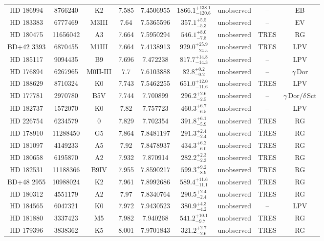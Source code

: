 \begin{table*}
\begin{tabular}{ccccccccc}
HD 186994 & 8766240 & K2 & 7.585 & 7.4506955 & $1866.1^{+138.1}_{-120.6}$ & unobserved & -- & EB \\
HD 183383 & 6777469 & M3III & 7.64 & 7.5365596 & $357.1^{+5.5}_{-5.3}$ & unobserved & -- & EV \\
HD 180475 & 11656042 & A3 & 7.664 & 7.5950294 & $546.1^{+8.0}_{-7.8}$ & unobserved & TRES & RG \\
BD+42 3393 & 6870455 & M1III & 7.664 & 7.4138913 & $929.0^{+25.9}_{-24.5}$ & unobserved & TRES & LPV \\
HD 185117 & 9094435 & B9 & 7.696 & 7.472238 & $817.7^{+14.8}_{-14.3}$ & unobserved & -- & LPV \\
HD 176894 & 6267965 & M0II-III & 7.7 & 7.6103888 & $82.8^{+0.2}_{-0.2}$ & unobserved & -- & $\gamma\,\text{Dor}$ \\
HD 188629 & 8710324 & K0 & 7.743 & 7.5462255 & $651.0^{+12.0}_{-11.6}$ & unobserved & TRES & LPV \\
HD 177781 & 2970780 & B5V & 7.744 & 7.700899 & $296.2^{+2.6}_{-2.5}$ & unobserved & -- & $\gamma\,\text{Dor} /\delta\,\text{Sct}$ \\
HD 182737 & 1572070 & K0 & 7.82 & 7.757723 & $460.3^{+6.7}_{-6.5}$ & unobserved & -- & LPV \\
HD 226754 & 6234579 & 0 & 7.829 & 7.702354 & $391.8^{+6.1}_{-5.9}$ & unobserved & TRES & RG \\
HD 178910 & 11288450 & G5 & 7.864 & 7.8481197 & $291.3^{+2.4}_{-2.4}$ & unobserved & TRES & RG \\
HD 181097 & 4149233 & A5 & 7.92 & 7.8478937 & $434.3^{+6.2}_{-6.0}$ & unobserved & TRES & RG \\
HD 180658 & 6195870 & A2 & 7.932 & 7.870914 & $282.2^{+2.3}_{-2.3}$ & unobserved & TRES & RG \\
HD 182531 & 11188366 & B9IV & 7.955 & 7.8590217 & $599.3^{+9.2}_{-8.9}$ & unobserved & TRES & RG \\
BD+48 2955 & 10988024 & K2 & 7.961 & 7.8992686 & $589.4^{+11.6}_{-11.1}$ & unobserved & TRES & RG \\
HD 180312 & 4551179 & A2 & 7.97 & 7.8340764 & $290.5^{+2.4}_{-2.4}$ & unobserved & TRES & RG \\
HD 184565 & 6047321 & K0 & 7.972 & 7.9430523 & $380.9^{+4.3}_{-4.2}$ & unobserved & -- & LPV \\
HD 181880 & 3337423 & M5 & 7.982 & 7.940268 & $541.2^{+10.1}_{-9.7}$ & unobserved & TRES & RG \\
HD 179396 & 3838362 & K5 & 8.001 & 7.9701843 & $321.2^{+2.7}_{-2.6}$ & unobserved & TRES & RG \\

\end{tabular}
\end{table*}
